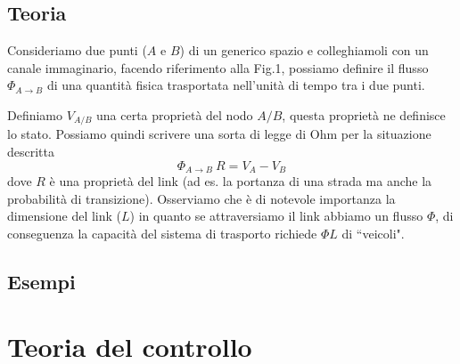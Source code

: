 \documentclass[12pt, a4paper]{book}
\theoremstyle{theorem}
\begin{document}
		\section{Teoria}
			Consideriamo due punti ($A$ e $B$) di un generico spazio e colleghiamoli con un canale immaginario, facendo riferimento alla Fig.1, possiamo definire il flusso $\Phi_{A \rightarrow B}$ di una quantità fisica trasportata nell'unità di tempo tra i due punti.
			\begin{figure}[ht!]
					\centering
					\caption{}
			\end{figure}
			Definiamo $V_{A/B}$ una certa proprietà del nodo $A/B$, questa proprietà ne definisce lo stato. Possiamo quindi scrivere una sorta di legge di Ohm per la situazione descritta 
			\begin{equation}
					\Phi_{A \rightarrow B} \ R = V_A - V_B
			\end{equation} dove $R$ è una proprietà del link (ad es. la portanza di una strada ma anche la probabilità di transizione).
			Osserviamo che è di notevole importanza la dimensione del link ($L$) in quanto se attraversiamo il link abbiamo un flusso $\Phi$, di conseguenza la capacità del sistema di trasporto richiede $\Phi L$ di “veicoli".			
			\begin{figure}[ht!]
					\centering
					\caption{}
			\end{figure}
		
		\section{Esempi}

		
	
	
	\chapter{Teoria del controllo} %
\end{document}
